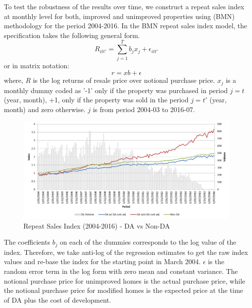 \documentclass[AEJ,reqno, draftmode]{AEA} %
\begin{document}
To test the robustness of the results over time, we construct a repeat sales index at monthly level for both, improved and unimproved properties using \citet{bailey1963regression} (BMN) methodology for the period 2004-2016. In the BMN repeat sales index model, the specification takes the following general form.
\begin{equation}
    R_{itt'} = \sum\limits_{j=1}^{T} b_jx_j + \epsilon_{itt'}  
\end{equation}
or in matrix notation: $$r = xb + \epsilon$$
where, $R$ is the log returns of resale price over notional purchase price. $x_j$ is a monthly dummy coded as '-1' only if the property was purchased in period $j = t$ (year, month), +1, only if the property was sold in the period $j = t'$ (year, month) and zero otherwise. $j$ is from period 2004-03 to 2016-07. 
\begin{figure}[!htb]
    \centering
     \includegraphics[width=\columnwidth]{Figures/Repeat_sales_index_post_2004_notional_purchase.png}
 \caption{Repeat Sales Index (2004-2016) - DA vs Non-DA}
 \label{fig:BMN_RS_index_post_2004}
\end{figure}

The coefficients $b_j$ on each of the dummies corresponds to the log value of the index. Therefore, we take anti-log of the regression estimates to get the raw index values and re-base the index for the starting point in March 2004.  $\epsilon$ is the random error term in the log form with zero mean and constant variance. The notional purchase price for unimproved homes is the actual purchase price, while the notional purchase price for modified homes is the expected price at the time of DA plus the cost of development. 
\end{document}
